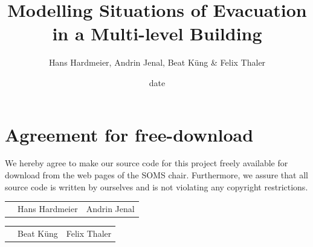 \documentclass[11pt]{article}
\title{Modelling Situations of Evacuation in a Multi-level Building}
\author{Hans Hardmeier, Andrin Jenal, Beat Küng & Felix Thaler}
\date{date}
\begin{document}

\newpage


\newpage
\section*{Agreement for free-download}
\bigskip


\bigskip


\large We hereby agree to make our source code for this project freely available for download from the web pages of the SOMS chair. Furthermore, we assure that all source code is written by ourselves and is not violating any copyright restrictions.

\begin{center}

\bigskip
\bigskip
\bigskip
\bigskip


\begin{tabular}{@{}p{3.3cm}@{}p{6cm}@{}@{}p{6cm}@{}}

\begin{minipage}{3cm}

\end{minipage}
&
\begin{minipage}{6cm}
\vspace{2mm} \large Hans Hardmeier

 \vspace{\baselineskip}

\end{minipage}
&
\begin{minipage}{6cm}

\large Andrin Jenal

\end{minipage}

\end{tabular}

\bigskip
\bigskip
\bigskip
\bigskip


\begin{tabular}{@{}p{3.3cm}@{}p{6cm}@{}@{}p{6cm}@{}}

\begin{minipage}{3cm}

\end{minipage}
&
\begin{minipage}{6cm}
\vspace{2mm} \large Beat Küng

 \vspace{\baselineskip}

\end{minipage}
&
\begin{minipage}{6cm}

\large Felix Thaler

\end{minipage}
\end{tabular}

\end{center}
\newpage
\end{document}
